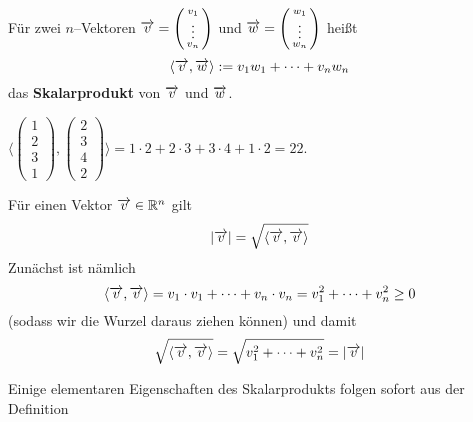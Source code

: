 \begin{definition}
Für zwei $n$--Vektoren $\overrightarrow{v} = \left( \begin{smallmatrix} v_1 \\ \vdots \\  v_n \end{smallmatrix} 
\right)$ und  $\overrightarrow{w} = \left( \begin{smallmatrix} w_1 \\  \vdots \\ w_n \end{smallmatrix} \right)$ 
heißt
  	$$ \langle \overrightarrow{v}, \overrightarrow{w} \rangle := v_1 w_1 + \cdots + v_n w_n $$
das \textbf{Skalarprodukt} von $\overrightarrow{v}$ und $\overrightarrow{w}$.
\end{definition}

\begin{beispiel}
$ \langle  \left( \begin{smallmatrix} 1 \\ 2 \\ 3 \\ 1
\end{smallmatrix} \right),  \left( \begin{smallmatrix} 2 \\ 3 \\ 4 \\ 2 
\end{smallmatrix} \right) \rangle = 1 \cdot 2 + 2 \cdot 3 + 3 \cdot 4 + 1 \cdot 2 = 22$.
\end{beispiel}

\begin{notiz}
Für einen Vektor $\overrightarrow{v} \in \mathbb R^n$ gilt 
	$$ \vert \overrightarrow{v} \vert = \sqrt{ \langle \overrightarrow{v}, \overrightarrow{v} \rangle} $$
Zunächst ist nämlich 
	$$  \langle \overrightarrow{v}, \overrightarrow{v} \rangle = v_1 \cdot v_1 + \cdots + v_n \cdot v_n = 
	v_1^2 + \cdots + v_n^2  \geq 0 $$
(sodass wir die Wurzel daraus ziehen können) und damit 
	$$ \sqrt{ \langle \overrightarrow{v}, \overrightarrow{v} \rangle}  = \sqrt{ v_1^2 + \cdots + v_n^2 } 
	= \vert \overrightarrow{v} \vert $$
\end{notiz}

\medbreak

Einige elementaren Eigenschaften des Skalarprodukts folgen sofort aus 
der Definition

